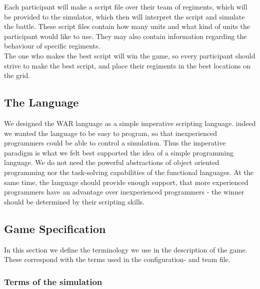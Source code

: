 		Each participant will make a script file over their team of regiments, which will be provided to the simulator, 
		which then will interpret the script and simulate the battle. 
		These script files contain how many units and what kind of units the participant would like to use. 
		They may also contain information regarding the behaviour of specific regiments. 
		\\
		The one who makes the best script will win the game, so every participant should strive to make the best script, 
		and place their regiments in the best locations on the grid.
		\\

	\subsection{The Language}
		We designed the WAR language as a simple imperative scripting language. 
		indeed we wanted the language to be easy to program, so that inexperienced programmers could be able to control a simulation. Thus the imperative paradigm is what we felt best supported the idea of a simple programming language. We do not need the	powerful abstractions of object oriented programming nor the task-solving capabilities of the functional languages. At the same time, the language should provide enough support, that more experienced programmers have an advantage over inexperienced programmers - the winner should be determined by their scripting skills.
		
		 
	\subsection{Game Specification}
	In this section we define the terminology we use in the description of the game.
	These correspond with the terms used in the configuration- and team file.
	
		\subsubsection{Terms of the simulation}
		
